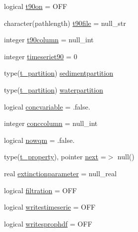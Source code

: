 \begin{DoxyCompactItemize}
\item 
logical \mbox{\hyperlink{structmodulelagrangianglobal_1_1t__property_a60c99b5a978b04662a163ccfac4b9ca7}{t90on}} = O\+FF
\item 
character(pathlength) \mbox{\hyperlink{structmodulelagrangianglobal_1_1t__property_adb2c5bda2332d7fb7501c4f4ab5ca63b}{t90file}} = null\+\_\+str
\item 
integer \mbox{\hyperlink{structmodulelagrangianglobal_1_1t__property_aa6ba0fb4a7df6bddbf04ac52f8631159}{t90column}} = null\+\_\+int
\item 
integer \mbox{\hyperlink{structmodulelagrangianglobal_1_1t__property_ab00ee8cd1d2706382275a6d235a4e049}{timeseriet90}} = 0
\item 
type(\mbox{\hyperlink{structmodulelagrangianglobal_1_1t__partition}{t\+\_\+partition}}) \mbox{\hyperlink{structmodulelagrangianglobal_1_1t__property_a59fd061fe492f373ca2b14e2a1ac0225}{sedimentpartition}}
\item 
type(\mbox{\hyperlink{structmodulelagrangianglobal_1_1t__partition}{t\+\_\+partition}}) \mbox{\hyperlink{structmodulelagrangianglobal_1_1t__property_a87b85b55bf015639b7f5f7439d3f1a96}{waterpartition}}
\item 
logical \mbox{\hyperlink{structmodulelagrangianglobal_1_1t__property_a3b6f61230bd6d752e2f2afbf9b3500d2}{concvariable}} = .false.
\item 
integer \mbox{\hyperlink{structmodulelagrangianglobal_1_1t__property_a58b7c0eca46bc66d5cd7614a01d7233f}{conccolumn}} = null\+\_\+int
\item 
logical \mbox{\hyperlink{structmodulelagrangianglobal_1_1t__property_acdd01433c02d8188f99d4e7628a6b21f}{nowqm}} = .false.
\item 
type(\mbox{\hyperlink{structmodulelagrangianglobal_1_1t__property}{t\+\_\+property}}), pointer \mbox{\hyperlink{structmodulelagrangianglobal_1_1t__property_a01707b846f13fb08990123a2f3a346c0}{next}} =$>$ null()
\item 
real \mbox{\hyperlink{structmodulelagrangianglobal_1_1t__property_ab6b708ae318407705d795ace8e2c9e9d}{extinctionparameter}} = null\+\_\+real
\item 
logical \mbox{\hyperlink{structmodulelagrangianglobal_1_1t__property_a32addc5184b86041f3daeae5e6537328}{filtration}} = O\+FF
\item 
logical \mbox{\hyperlink{structmodulelagrangianglobal_1_1t__property_a7cfd52f5db8d249baf208e7ac81a38c2}{writestimeserie}} = O\+FF
\item 
logical \mbox{\hyperlink{structmodulelagrangianglobal_1_1t__property_afd23e76ff37c1bc287a18d85bb60a437}{writesprophdf}} = O\+FF

\end{DoxyCompactItemize}
